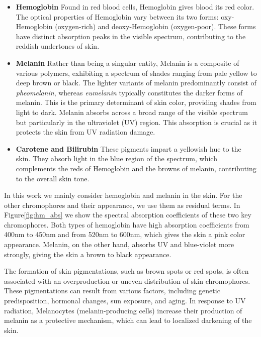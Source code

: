 \begin{spacing}{1.5}
\begin{itemize}
    \item \textbf{Hemoglobin} Found in red blood cells, Hemoglobin gives blood its red color. The optical properties of Hemoglobin vary between its two forms: oxy-Hemoglobin (oxygen-rich) and deoxy-Hemoglobin (oxygen-poor). These forms have distinct absorption peaks in the visible spectrum, contributing to the reddish undertones of skin.
    \item \textbf{Melanin} Rather than being a singular entity, Melanin is a composite of various polymers, exhibiting a spectrum of shades ranging from pale yellow to deep brown or black. The lighter variants of melanin predominantly consist of \textit{pheomelanin}, whereas \textit{eumelanin} typically constitutes the darker forms of melanin\cite{alalufEthnicVariationMelanin2002a}. This is the primary determinant of skin color\cite{doiSpectralEstimationHuman2003}, providing shades from light to dark. Melanin absorbs across a broad range of the visible spectrum but particularly in the ultraviolet (UV) region\cite{ANDERSON198113}. This absorption is crucial as it protects the skin from UV radiation damage. 
    \item \textbf{Carotene and Bilirubin} These pigments impart a yellowish hue to the skin. They absorb light in the blue region of the spectrum, which complements the reds of Hemoglobin and the browns of melanin, contributing to the overall skin tone\cite{ANDERSON198113}.
\end{itemize}


In this work we mainly consider hemoglobin and melanin in the skin. For the other chromophores and their appearance, we use them as residual terms. In Figure\ref{fig:hm_abs} we show the spectral absorption coefficients of these two key chromophores. Both types of hemoglobin have high absorption coefficients from 400nm to 450nm and from 520nm to 600nm, which gives the skin a pink color appearance. Melanin, on the other hand, absorbs UV and blue-violet more strongly, giving the skin a brown to black appearance.

The formation of skin pigmentations, such as brown spots or red spots, is often associated with an overproduction or uneven distribution of skin chromophores. These pigmentations can result from various factors, including genetic predisposition, hormonal changes, sun exposure, and aging. In response to UV radiation, Melanocytes (melanin-producing cells) increase their production of melanin as a protective mechanism, which can lead to localized darkening of the skin.


\end{spacing}
